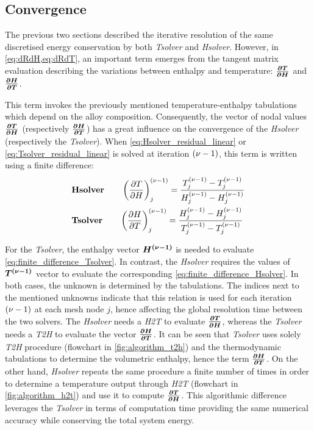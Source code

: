 \subsection{Convergence}
%
The previous two sections described the iterative resolution of the same discretised energy 
conservation by both \emph{Tsolver} and \emph{Hsolver}. However, in \cref{eq:dRdH,eq:dRdT}, an important 
term emerges from the tangent matrix evaluation describing the variations between enthalpy and temperature: 
$\boldsymbol{\frac{\partial T}{\partial H}}$ and $\boldsymbol{\frac{\partial H}{\partial T}}$. 

This term invokes the previously mentioned temperature-enthalpy 
tabulations which depend on the alloy composition. Consequently, the vector of nodal values $\boldsymbol{\frac{\partial T}{\partial H}}$ (respectively $\boldsymbol{\frac{\partial H}{\partial T}}$)
has a great influence on the convergence of the \emph{Hsolver} (respectively the \emph{Tsolver}). 
When \cref{eq:Hsolver_residual_linear} or \cref{eq:Tsolver_residual_linear} 
is solved at iteration $\iterplus$, this term is written using a finite difference:
\begin{align}
\label{eq:finite_difference_Hsolver}
& \textbf{Hsolver} \qquad \brac{\dTdH}^{\iterplus}_{j} = \frac{T_j^\iterplus - T_j^\iter}{H_j^\iterplus - H_j^\iter} \\ 
\label{eq:finite_difference_Tsolver}
& \textbf{Tsolver} \qquad \brac{\dHdT}^{\iterplus}_{j} = \frac{H_j^\iterplus - H_j^\iter}{T_j^\iterplus - T_j^\iter}
\end{align}

For the \emph{Tsolver}, the enthalpy vector $\boldsymbol{H^{{\left( \nu-1 \right)}}}$ is needed to evaluate \cref{eq:finite_difference_Tsolver}. 
In contrast, the \emph{Hsolver} requires the values of $\boldsymbol{T^{{\left( \nu-1 \right)}}}$ vector to evaluate the corresponding \cref{eq:finite_difference_Hsolver}.
In both cases, the unknown is determined by the tabulations. The indices next to the mentioned unknowns
indicate that this relation is used for each iteration $\iterplus$ at each mesh node $j$, 
hence affecting the global resolution time 
between the two solvers. The \emph{Hsolver} needs a \emph{H2T} to evaluate $\boldsymbol{\frac{\partial T}{\partial H}}$, 
whereas the \emph{Tsolver} needs a \emph{T2H} to evaluate the vector $\boldsymbol{\frac{\partial H}{\partial T}}$.
It can be seen that \emph{Tsolver} uses solely \emph{T2H} procedure 
(flowchart in \cref{fig:algorithm_t2h}) and the thermodynamic tabulations to determine the volumetric enthalpy, 
hence the term $\boldsymbol{\frac{\partial H}{\partial T}}$. On the other hand, \emph{Hsolver} repeats the same procedure a finite number of times in order to 
determine a temperature output through \emph{H2T} (flowchart in \cref{fig:algorithm_h2t}) and use it to compute $\boldsymbol{\frac{\partial T}{\partial H}}$. 
This algorithmic difference leverages the 
\emph{Tsolver} in terms of computation time providing 
the same numerical accuracy while conserving the total system energy. 

